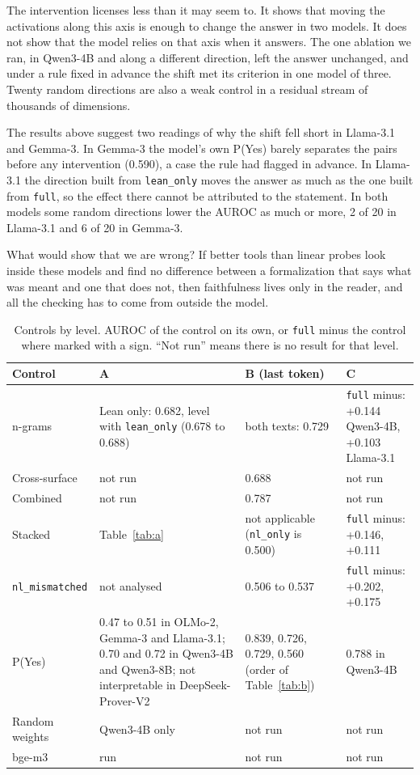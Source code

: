 \documentclass[10pt]{article}
\newcommand{\vr}[1]{\texttt{#1}}
\begin{document}
The intervention licenses less than it may seem to. It shows that moving the activations along this axis is enough to
change the answer in two models. It does not show that the model relies on that axis when it answers. The one
ablation we ran, in Qwen3-4B and along a different direction, left the answer unchanged, and under a rule fixed in
advance the shift met its criterion in one model of three. Twenty random directions are also a weak control in a
residual stream of thousands of dimensions.

The results above suggest two readings of why the shift fell short in Llama-3.1 and Gemma-3. In Gemma-3 the model's
own P(Yes) barely separates the pairs before any intervention (0.590), a case the rule had flagged in advance. In
Llama-3.1 the direction built from \vr{lean\_only} moves the answer as much as the one built from \vr{full}, so the
effect there cannot be attributed to the statement. In both models some random directions lower the AUROC as much or
more, 2 of 20 in Llama-3.1 and 6 of 20 in Gemma-3.

What would show that we are wrong? If better tools than linear probes look inside these models and find no difference
between a formalization that says what was meant and one that does not, then faithfulness lives only in the reader,
and all the checking has to come from outside the model.

\begin{table}[h]
\centering
\caption{Controls by level. AUROC of the control on its own, or \vr{full} minus the control where marked with a sign. ``Not run'' means there is no result for that level.}
\label{tab:controlesnivel}
\vspace{2pt}
{\small
\begin{tabularx}{\linewidth}{@{}lXXX@{}}
\toprule
Control & A & B (last token) & C\\
\midrule
n-grams & Lean only: 0.682, level with \vr{lean\_only} (0.678 to 0.688) & both texts: 0.729 & \vr{full} minus: +0.144 Qwen3-4B, +0.103 Llama-3.1\\
Cross-surface & not run & 0.688 & not run\\

Combined & not run & 0.787 & not run\\
Stacked & Table~\ref{tab:a} & not applicable (\vr{nl\_only} is 0.500) & \vr{full} minus: +0.146, +0.111\\
\vr{nl\_mismatched} & not analysed & 0.506 to 0.537 & \vr{full} minus: +0.202, +0.175\\
P(Yes) & 0.47 to 0.51 in OLMo-2, Gemma-3 and Llama-3.1; 0.70 and 0.72 in Qwen3-4B and Qwen3-8B; not interpretable in DeepSeek-Prover-V2 & 0.839, 0.726, 0.729, 0.560 (order of Table~\ref{tab:b}) & 0.788 in Qwen3-4B\\
Random weights & Qwen3-4B only & not run & not run\\
bge-m3 & run & not run & not run\\
\bottomrule
\end{tabularx}}
\end{table}
\end{document}
